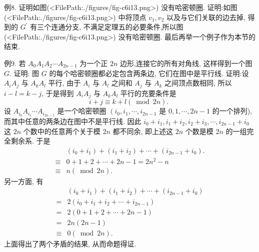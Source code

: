 例8. 证明如图(<FilePath:./figures/fig-c6i13.png>) 没有哈密顿圈.
证明:如图(<FilePath:./figures/fig-c6i13.png>) 中将顶点 $v_1, v_2$ 以及与它们关联的边去掉, 得到的 $G^{\prime}$ 有三个连通分支, 不满足定理五的必要条件,所以图 (<FilePath:./figures/fig-c6i13.png>) 没有哈密顿圈.
最后再举一个例子作为本节的结束.



例9. 若 $A_0 A_1 A_2 \cdots A_{2 n-1}$ 为一个正 $2 n$ 边形,连接它的所有对角线, 这样得到一个图 $G$. 证明: 图 $G$ 的每个哈密顿圈都必定包含两条边, 它们在图中是平行线.
证明:设 $A_i A_j$ 与 $A_k A_l$ 平行, 由于 $A_i$ 与 $A_l$ 之间和 $A_j$ 与 $A_k$ 之间顶点数相同, 所以 $i-l=k-j$, 于是得到 $A_i A_j$ 与 $A_k A_l$ 平行的充要条件是
$$
i+j \equiv k+l(\bmod 2 n) \text {. }
$$
设 $A_{i_0} A_{i_1} \cdots A_{i_{2 n-1}}$ 是一个哈密顿圈 $\left(i_0, i_1, \cdots, i_{2 n-1}\right.$ 是 $0,1, \cdots, 2 n-1$ 的一个排列), 而其中任意的两条边在图中不是平行线.
因此 $i_0+i_1, i_1+i_2, i_2+ i_3, \cdots, i_{2 n-1}+i_0$ 这 $2 n$ 个数中的任意两个关于模 $2 n$ 都不同余, 即上述这 $2 n$ 个数是模 $2 n$ 的一组完全剩余系.
于是
$$
\begin{aligned}
& \left(i_0+i_1\right)+\left(i_1+i_2\right)+\cdots+\left(i_{2 n-1}+i_0\right) . \\
\equiv & 0+1+2+\cdots+2 n-1=2 n^2-n \\
\equiv & n(\bmod 2 n) .
\end{aligned}
$$
另一方面, 有
$$
\begin{aligned}
& \left(i_0+i_1\right)+\left(i_1+i_2\right)+\cdots+\left(i_{2 n-1}+i_0\right) \\
= & 2\left(i_0+i_1+i_2+\cdots+i_{2 n-1}\right) \\
= & 2(0+1+2+\cdots+2 n-1) \\
= & 2 n(2 n-1) \\
\equiv & 0(\bmod 2 n) .
\end{aligned}
$$
上面得出了两个矛盾的结果, 从而命题得证.


